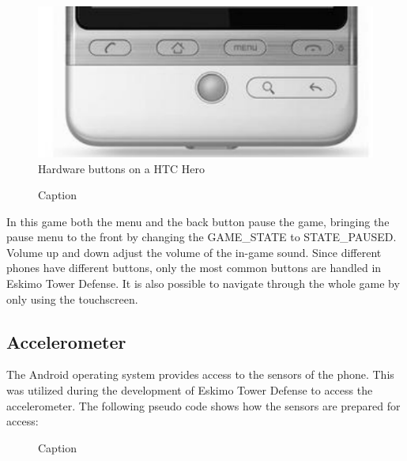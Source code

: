 \begin{figure} [here]
\begin{center}
\includegraphics[scale=0.6]{pics/chapters/chapter4/physicalbuttons}
\end{center}
\caption{Hardware buttons on a HTC Hero}
\label{fig:htcHeroButtons}
\end{figure}

\clearpage

\begin{figure}[here]
\begin{small}

\end{small}
\caption{Caption}
\label{fig:codeExOnKeyDown}
\end{figure}

In this game both the menu and the back button pause the game, bringing the pause menu to the front by changing the GAME\_STATE to STATE\_PAUSED. Volume up and down adjust the volume of the in-game sound. Since different phones have different buttons, only the most common buttons are handled in Eskimo Tower Defense. It is also possible to navigate through the whole game by only using the touchscreen.

\subsection{Accelerometer}

The Android operating system provides access to the sensors of the phone. This was utilized during the development of Eskimo Tower Defense to access the accelerometer. The following pseudo code shows how the sensors are prepared for access:

\begin{figure}[htb]

\begin{small}

\end{small}

\caption{Caption}
\label{fig:codeExAccelerometerCode}

\end{figure}

